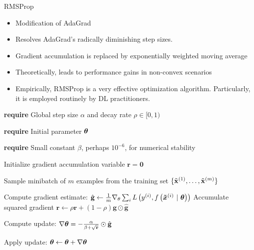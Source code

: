 \documentclass[11pt,compress,t,notes=noshow, xcolor=table]{beamer}
\begin{document}

\begin{vbframe}{RMSProp}
	\begin{itemize}
		\item Modification of AdaGrad
		\item Resolves AdaGrad's radically diminishing step sizes.
		\item Gradient accumulation is replaced by exponentially weighted moving average
		\item Theoretically, leads to performance gains in non-convex scenarios
		\item Empirically, RMSProp is a very effective optimization algorithm.
            Particularly, it is employed routinely by DL practitioners.
	\end{itemize}
	
	\framebreak
	
	
	\begin{algorithm}[H]
		\small
		\caption{RMSProp}
		\begin{algorithmic}[1]
			\State \textbf{require} Global step size $\alpha$ and decay rate $\rho \in [0, 1)$ \strut
			\State \textbf{require} Initial parameter $\mathbf{\bm{\theta}}$ \strut
			\State \parbox[t]{\dimexpr\linewidth-\algorithmicindent}{\textbf{require} Small constant $\beta$, perhaps $10^{-6}$, for numerical stability \strut}
			\State Initialize gradient accumulation variable $\mathbf{r} = \mathbf{0} $
			\State \parbox[t]{\dimexpr\linewidth-\algorithmicindent}{Sample minibatch of $m$ examples from the training set $\{\tilde{\mathbf{x}}^{(1)},\dots,\tilde{\mathbf{x}}^{(m)}\}$ \strut}
			\State Compute gradient estimate: $\hat{\mathbf{g}} \leftarrow \frac{1}{m} \nabla_\theta \sum_{i} L\left(y^{(i)}, f\left(\bm{\tilde{x}}^{(i)} ~|~ \bm{\theta}\right)\right)$
			\State Accumulate squared gradient $\mathbf{r} \leftarrow \rho \mathbf{r} + (1 - \rho) \hat{\mathbf{g}} \odot  \hat{\mathbf{g}}$
			\State \parbox[t]{\dimexpr\linewidth-\algorithmicindent}{Compute update: $\nabla\mathbf{\bm{\theta}} = - \frac{\alpha}{\beta + \sqrt\mathbf{r}} \odot \hat{\mathbf{g}}$ \strut}
			\State Apply update: $\mathbf{\bm{\theta}} \leftarrow \mathbf{\bm{\theta}} + \nabla\mathbf{\bm{\theta}}$
			\EndWhile
		\end{algorithmic}
	\end{algorithm}
\end{vbframe}
\end{document}
